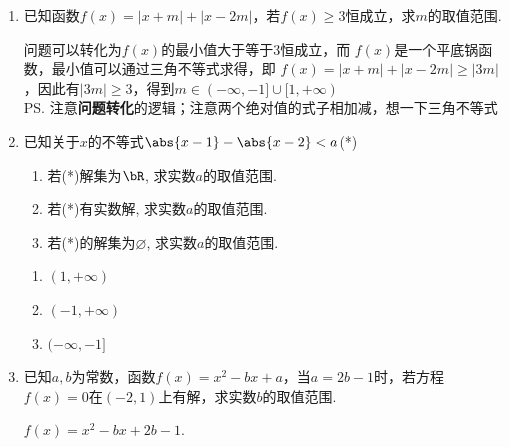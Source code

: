 \begin{enumerate}
    \item 已知函数$f(x) = |x+m| + |x-2m|$，若$f(x) \geq 3$恒成立，求$m$的取值范围.
    \begin{jieda}
        问题可以转化为$f(x)$的最小值大于等于3恒成立，而 $f(x)$是一个平底锅函数，最小值可以通过三角不等式求得，即 $f(x) = |x+m| + |x-2m| \geq |3m|$，因此有$|3m| \geq 3$，得到$m \in (-\infty, -1] \cup [1, +\infty)$ \\
        \ps 注意\textbf{问题转化}的逻辑；注意两个绝对值的式子相加减，想一下三角不等式
    \end{jieda}
    \begin{vspace_}
        \vsp[6]
    \end{vspace_}
    \item 已知关于$x$的不等式$\abs{x-1}-\abs{x-2}<a$(*)
    \begin{enumerate}
        \item 若(*)解集为$\bR$, 求实数$a$的取值范围.
        \item 若(*)有实数解, 求实数$a$的取值范围. 
        \item 若(*)的解集为$\varnothing$, 求实数$a$的取值范围.
    \end{enumerate}
    \begin{jieda}
    \begin{enumerate}
        \item $(1, +\infty)$
        \item $(-1, +\infty)$
        \item $(-\infty, -1]$
    \end{enumerate}
    \end{jieda}
    \begin{vspace_}
        \vsp[6]
    \end{vspace_}
    \item 已知$a, b$为常数，函数$f(x) = x^2 - bx + a$，当$a = 2b-1$时，若方程$f(x) = 0$在$(-2, 1)$上有解，求实数$b$的取值范围.
    \begin{jieda}
        $f(x) = x^2 - bx + 2b - 1$.
\end{jieda}
\end{enumerate}
